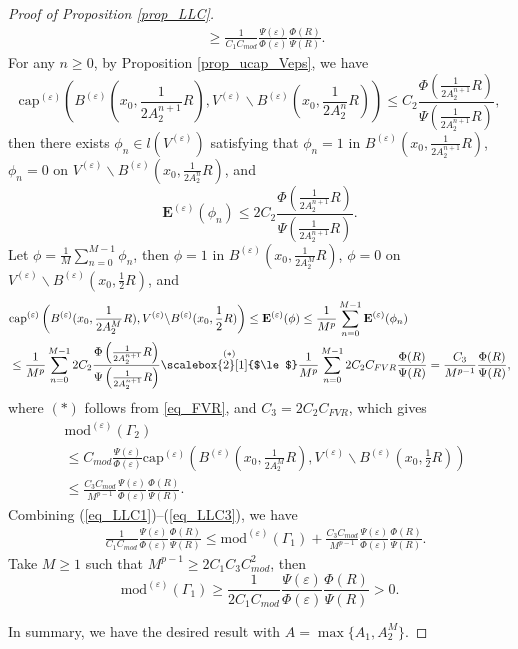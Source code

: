 \documentclass[11pt,a4paper]{article}
\numberwithin{equation}{section}
\theoremstyle{plain}
\theoremstyle{definition}
\begin{document}
\begin{proof}[Proof of Proposition \ref{prop_LLC}]
\begin{align}
&\ge \frac{1}{C_1C_{mod}}\frac{\Psi(\varepsilon)}{\Phi(\varepsilon)}\frac{\Phi(R)}{\Psi(R)}.\label{eq_LLC2}
\end{align}
For any $n\ge0$, by Proposition \ref{prop_ucap_Veps}, we have
$$\mathrm{cap}^{(\varepsilon)}\left(B^{(\varepsilon)}(x_0,\frac{1}{2A_{2}^{n+1}}R),V^{(\varepsilon)}\backslash B^{(\varepsilon)}(x_0,\frac{1}{2A_{2}^{n}}R)\right)\le C_2 \frac{\Phi \left(\frac{1}{2A_{2}^{n+1}}R\right)}{\Psi \left(\frac{1}{2A_{2}^{n+1}}R\right)},$$
then there exists $\phi_n\in l(V^{(\varepsilon)})$ satisfying that $\phi_n=1$ in $B^{(\varepsilon)}(x_0,\frac{1}{2A_{2}^{n+1}}R)$, $\phi_n=0$ on $V^{(\varepsilon)}\backslash B^{(\varepsilon)}(x_0,\frac{1}{2A_{2}^{n}}R)$, and
$$\mathbf{E}^{(\varepsilon)}(\phi_n)\le 2C_2 \frac{\Phi \left(\frac{1}{2A_{2}^{n+1}}R\right)}{\Psi \left(\frac{1}{2A_{2}^{n+1}}R\right)}.$$
Let $\phi=\frac{1}{M}\sum_{n=0}^{M-1}\phi_n$, then $\phi=1$ in $B^{(\varepsilon)}(x_0,\frac{1}{2A_{2}^{M}}R)$, $\phi=0$ on $V^{(\varepsilon)}\backslash B^{(\varepsilon)}(x_0,\frac{1}{2}R)$, and
\begin{align*}
&\mathrm{cap}^{(\varepsilon)}\left(B^{(\varepsilon)}(x_0, \frac{1}{2A_{2}^{M}}R),V^{(\varepsilon)}\backslash B^{(\varepsilon)}(x_0,\frac{1}{2}R)\right)\le\mathbf{E}^{(\varepsilon)}(\phi)\le \frac{1}{M^p}\sum_{n=0}^{M-1}\mathbf{E}^{(\varepsilon)}(\phi_n)\\
&\le \frac{1}{M^p}\sum_{n=0}^{M-1}2C_2 \frac{\Phi \left(\frac{1}{2A_{2}^{n+1}}R\right)}{\Psi \left(\frac{1}{2A_{2}^{n+1}}R\right)}\overset{(*)}{\scalebox{2}[1]{$\le$}}\frac{1}{M^p}\sum_{n=0}^{M-1}2C_2 C_{FVR}\frac{\Phi(R)}{\Psi(R)}=\frac{C_3}{M^{p-1}}\frac{\Phi(R)}{\Psi(R)},
\end{align*}
where $(*)$ follows from \ref{eq_FVR}, and $C_3=2C_2C_{FVR}$, which gives
\begin{align}
&\mathrm{mod}^{(\varepsilon)}(\Gamma_2)\nonumber\\
&\le C_{mod}\frac{\Psi(\varepsilon)}{\Phi(\varepsilon)}\mathrm{cap}^{(\varepsilon)}\left(B^{(\varepsilon)}(x_0, \frac{1}{2A_{2}^{M}}R),V^{(\varepsilon)}\backslash B^{(\varepsilon)}(x_0,\frac{1}{2}R)\right)\nonumber\\
&\le \frac{C_3C_{mod}}{M^{p-1}}\frac{\Psi(\varepsilon)}{\Phi(\varepsilon)}\frac{\Phi(R)}{\Psi(R)}.\label{eq_LLC3}
\end{align}
Combining (\ref{eq_LLC1})--(\ref{eq_LLC3}), we have
\begin{align*}
&\frac{1}{C_1C_{mod}}\frac{\Psi(\varepsilon)}{\Phi(\varepsilon)}\frac{\Phi(R)}{\Psi(R)}\le\mathrm{mod}^{(\varepsilon)}(\Gamma_1)+\frac{C_3C_{mod}}{M^{p-1}}\frac{\Psi(\varepsilon)}{\Phi(\varepsilon)}\frac{\Phi(R)}{\Psi(R)}.
\end{align*}
Take $M\ge1$ such that $M^{p-1}\ge2C_1C_3C_{mod}^2$, then
$$\mathrm{mod}^{(\varepsilon)}(\Gamma_1)\ge\frac{1}{2C_1C_{mod}}\frac{\Psi(\varepsilon)}{\Phi(\varepsilon)}\frac{\Phi(R)}{\Psi(R)}>0.$$

In summary, we have the desired result with $A=\max\{A_1,A_2^M\}$.
\end{proof}
\end{document}
